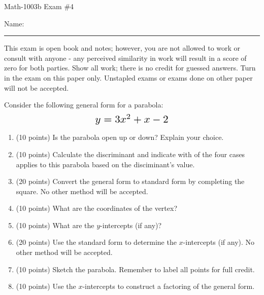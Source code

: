 \documentclass[letterpaper,12pt,fleqn]{article}
\begin{document}
\begin{center}
\Large Math-1003b Exam \#4
\end{center}

\vspace{0.5in}

Name: \rule{4in}{1pt}

\vspace{0.5in}

This exam is open book and notes; however, you are not allowed to work or consult with
anyone - any perceived similarity in work will result in a score of zero for both
parties. Show all work; there is no credit for guessed answers. Turn in the exam on
this paper only. Unstapled exams or exams done on other paper will not be accepted.

\vspace{0.25in}

Consider the following general form for a parabola:
\[\scalebox{1.5}{$y=3x^2+x-2$}\]

\bigskip

\begin{enumerate}
\item (10 points) Is the parabola open up or down? Explain your choice.

  \vspace{2in}

\item (10 points) Calculate the discriminant and indicate with of the four cases applies
  to this parabola based on the disciminant's value.

  \newpage

\item (20 points) Convert the general form to standard form by completing the square.
  No other method will be accepted.

  \vspace{4in}

\item (10 points) What are the coordinates of the vertex?

  \vspace{2in}

\item (10 points) What are the $y$-intercepts (if any)?

  \newpage

\item (20 points) Use the standard form to determine the $x$-intercepts (if any). No
  other method will be accepted.

  \vspace{4in}

\item (10 points) Sketch the parabola. Remember to label all points for full credit.

  \vspace{3in}

\item (10 points) Use the $x$-intercepts to construct a factoring of the general form.
\end{enumerate}
\end{document}
